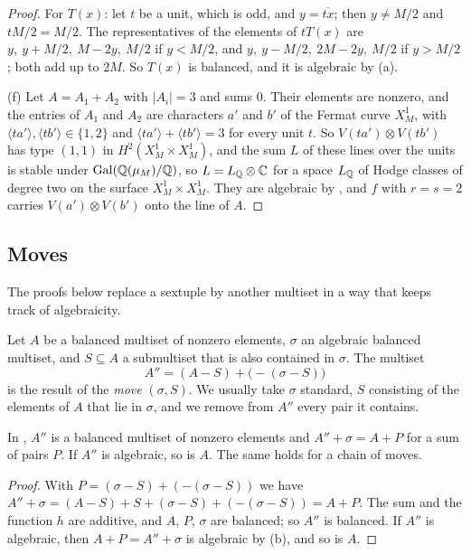 \begin{proof}
For $T(x)$: let $t$ be a unit, which is odd, and $y=\overline{tx}$; then
$y\ne M/2$ and $tM/2=M/2$. The representatives of the elements of $tT(x)$
are $y,\ y+M/2,\ M-2y,\ M/2$ if $y<M/2$, and $y,\ y-M/2,\ 2M-2y,\ M/2$ if
$y>M/2$; both add up to $2M$. So $T(x)$ is balanced, and it is algebraic by
(a).

(f) Let $A=A_{1}+A_{2}$ with $|A_{i}|=3$ and sums $0$. Their elements are
nonzero, and the entries of $A_{1}$ and $A_{2}$ are characters $a'$ and $b'$
of the Fermat curve $X^{1}_{M}$, with $\langle ta'\rangle,\langle
tb'\rangle\in\{1,2\}$ and $\langle ta'\rangle+\langle tb'\rangle=3$ for every
unit $t$. So $V(ta')\otimes V(tb')$ has type $(1,1)$ in
$H^{2}(X^{1}_{M}\times X^{1}_{M})$, and the sum $L$ of these lines over the
units is stable under $\operatorname{Gal}(\mathbb{Q}(\mu_{M})/\mathbb{Q})$, so
$L=L_{\mathbb{Q}}\otimes\mathbb{C}$ for a space $L_{\mathbb{Q}}$ of Hodge classes of degree two on
the surface $X^{1}_{M}\times X^{1}_{M}$. They are algebraic by
, and $f$ with $r=s=2$ carries $V(a')\otimes V(b')$ onto the
line of $A$.
\end{proof}

\subsection{Moves}
The proofs below replace a sextuple by another multiset in a way that keeps
track of algebraicity.

\begin{definition}\label{def:move}
Let $A$ be a balanced multiset of nonzero elements, $\sigma$ an algebraic
balanced multiset, and $S\subseteq A$ a submultiset that is also contained in
$\sigma$. The multiset
\[
  A''=(A-S)+\bigl(-(\sigma-S)\bigr)
\]
is the result of the \emph{move} $(\sigma,S)$. We usually take $\sigma$
standard, $S$ consisting of the elements of $A$ that lie in $\sigma$, and
we remove from $A''$ every pair it contains.
\end{definition}

\begin{lemma}\label{lem:move}
In , $A''$ is a balanced multiset of nonzero elements and
$A''+\sigma=A+P$ for a sum of pairs $P$. If $A''$ is algebraic, so is $A$.
The same holds for a chain of moves.
\end{lemma}

\begin{proof}
With $P=(\sigma-S)+(-(\sigma-S))$ we have $A''+\sigma=(A-S)+S+(\sigma-S)+
(-(\sigma-S))=A+P$. The sum and the function $h$ are additive, and $A$, $P$,
$\sigma$ are balanced; so $A''$ is balanced. If $A''$ is algebraic, then
$A+P=A''+\sigma$ is algebraic by (b), and so is $A$.
\end{proof}

